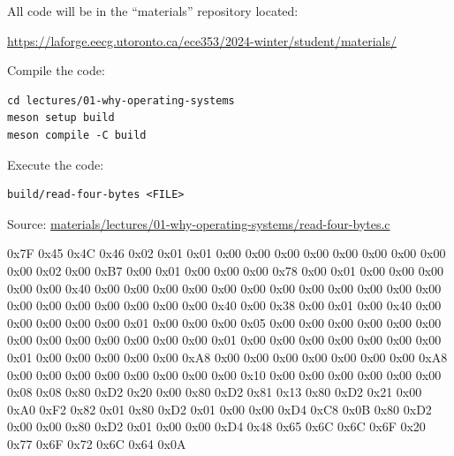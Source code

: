 \begin{slide}
  

  All code will be in the ``materials'' repository located:

  \url{https://laforge.eecg.utoronto.ca/ece353/2024-winter/student/materials/}
  \bigskip

  Compile the code:
  \begin{verbatim}
cd lectures/01-why-operating-systems
meson setup build
meson compile -C build
  \end{verbatim}
  \bigskip

  Execute the code:
  \begin{verbatim}
build/read-four-bytes <FILE>
  \end{verbatim}
  \bigskip

  Source:
  \href{https://laforge.eecg.utoronto.ca/ece353/2024-winter/student/materials/-/blob/main/lectures/01-why-operating-systems/read-four-bytes.c}
       {\ttfamily materials/lectures/01-why-operating-systems/read-four-bytes.c}
\end{slide}

\begin{slide}


  \small \ttfamily
  0x7F 0x45 0x4C 0x46 0x02 0x01 0x01 0x00 0x00 0x00 0x00 0x00 0x00 0x00 0x00
  0x00 \newline
  0x02 0x00 0xB7 0x00 0x01 0x00 0x00 0x00 0x78 0x00 0x01 0x00 0x00 0x00 0x00
  0x00 \newline
  0x40 0x00 0x00 0x00 0x00 0x00 0x00 0x00 0x00 0x00 0x00 0x00 0x00 0x00 0x00
  0x00 \newline
  0x00 0x00 0x00 0x00 0x40 0x00 0x38 0x00 0x01 0x00 0x40 0x00 0x00 0x00 0x00
  0x00 \newline
  0x01 0x00 0x00 0x00 0x05 0x00 0x00 0x00 0x00 0x00 0x00 0x00 0x00 0x00 0x00
  0x00 \newline
  0x00 0x00 0x01 0x00 0x00 0x00 0x00 0x00 0x00 0x00 0x01 0x00 0x00 0x00 0x00
  0x00 \newline
  0xA8 0x00 0x00 0x00 0x00 0x00 0x00 0x00 0xA8 0x00 0x00 0x00 0x00 0x00 0x00
  0x00 \newline
  0x00 0x10 0x00 0x00 0x00 0x00 0x00 0x00 0x08 0x08 0x80 0xD2 0x20 0x00 0x80
  0xD2 \newline
  0x81 0x13 0x80 0xD2 0x21 0x00 0xA0 0xF2 0x82 0x01 0x80 0xD2 0x01 0x00 0x00
  0xD4 \newline
  0xC8 0x0B 0x80 0xD2 0x00 0x00 0x80 0xD2 0x01 0x00 0x00 0xD4 0x48 0x65 0x6C
  0x6C \newline
  0x6F 0x20 0x77 0x6F 0x72 0x6C 0x64 0x0A
\end{slide}

